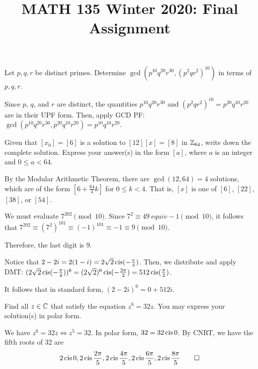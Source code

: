 \documentclass{agony}
\title{MATH 135 Winter 2020: Final Assignment}
\begin{document}
\thispagestyle{firstpage}
\textbf{\thetitle}

\begin{prob}
  Let $p,q,r$ be distinct primes.
  Determine $\gcd(p^{10}q^{20}r^{30},(p^2qr^2)^{10})$ in terms of $p,q,r$.
\end{prob}
\begin{sol}
  Since $p$, $q$, and $r$ are distinct, the quantities $p^{10}q^{20}r^{30}$
  and $(p^2qr^2)^{10} = p^{20}q^{10}r^{20}$ are in their UPF form.
  Then, apply GCD PF\@: $\gcd(p^{10}q^{20}r^{30},p^{20}q^{10}r^{20}) = p^{10}q^{10}r^{20}$.
\end{sol}

\begin{prob}
  Given that $[x_0] = [6]$ is a solution to $[12][x] = [8]$ in $\mathbb{Z}_{64}$, write down the complete solution.
  Express your answer(s) in the form $[a]$, where $a$ is an integer and $0 \leq a < 64$.
\end{prob}
\begin{sol}
  By the Modular Arithmetic Theorem, there are $\gcd(12,64) = 4$ solutions,
  which are of the form $[6+\frac{64}{4}k]$ for $0 \leq k < 4$.
  That is, $[x]$ is one of $[6]$, $[22]$, $[38]$, or $[54]$.
\end{sol}

\begin{sol}
  We must evaluate $7^{202} \pmod{10}$.
  Since $7^2 \equiv 49 \ equiv -1 \pmod 10$, it follows that $7^{202} \equiv (7^2)^{101} \equiv (-1)^{101} \equiv -1 \equiv 9 \pmod 10$.

  Therefore, the last digit is 9.
\end{sol}

\begin{sol}
  Notice that $2-2i = 2(1-i) = 2\sqrt{2}\operatorname{cis}(-\frac\pi4)$.
  Then, we distribute and apply DMT\@: $(2\sqrt{2}\operatorname{cis}(-\frac\pi4))^6 = (2\sqrt{2})^6\operatorname{cis}(-\frac{3\pi}{2}) = 512\operatorname{cis}(\frac{\pi}{2})$.

  It follows that in standard form, $(2-2i)^6 = 0 + 512i$.
\end{sol}

\begin{prob}
  Find all $z\in\mathbb{C}$ that satisfy the equation $z^6 = 32z$.
  You may express your solution(s) in polar form.
\end{prob}
\begin{sol}
  We have $z^6 = 32z \iff z^5 = 32$.
  In polar form, $32 = 32 \operatorname{cis} 0$.
  By CNRT, we have the fifth roots of 32 are
  \[ 2\operatorname{cis} 0, 2\operatorname{cis}\frac{2\pi}{5}, 2\operatorname{cis}\frac{4\pi}{5}, 2\operatorname{cis}\frac{6\pi}{5}, 2\operatorname{cis}\frac{8\pi}{5} \qedhere \]
\end{sol}
\end{document}
